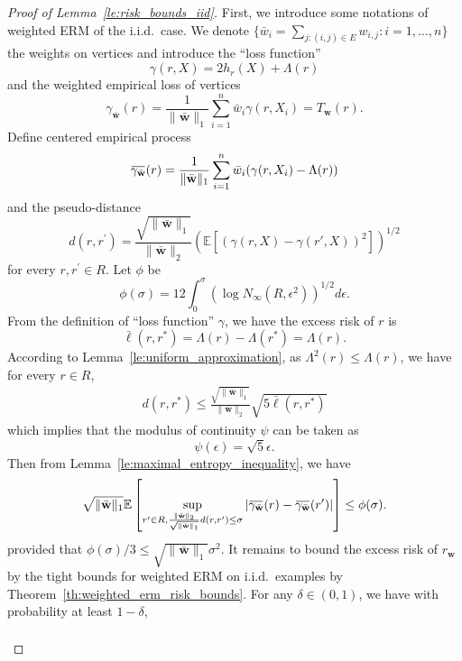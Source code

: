 \documentclass[letterpaper]{article} %
\def\DoubleColumn{}
\newcommand{\E}{\mathbb{E}}
\newcommand{\overbar}[1]{\mkern 1.5mu\overline{\mkern-1.5mu#1\mkern-1.5mu}\mkern 1.5mu}
\newcommand*\cen[1]{\overbar{#1}}
\newcommand{\weight}{\mathbf{w}}
\newcommand{\verticeweight}{\bar{\mathbf{w}}}
\newcommand{\relossf}{\bar{\ell}}
\newcommand{\cenprocess}[1]{\cen{\gamma_{#1}}}
\newcommand{\pair}[1]{(#1)}
\newcommand{\normo}[1]{\|#1\|_1}
\begin{document}
\begin{proof}[Proof of Lemma~\ref{le:risk_bounds_iid}] %
    First, we introduce some notations of weighted ERM of the i.i.d.\ case. 
    We denote $\{\bar{w}_i=\sum_{j:\pair{i,j}\in E}w_{i,j}: i=1,\dots,n\}$ the weights on vertices and introduce the ``loss function''
    \[\gamma(r, X)=2h_r(X)+\Lambda{}(r)\]
    and the weighted empirical loss of vertices
    \[\gamma_\verticeweight{}(r)=\frac{1}{\normo{\verticeweight{}}}\sum_{i=1}^n\bar{w}_i\gamma(r,X_i)=T_\weight{}(r).\]
    Define centered empirical process
    \[\cenprocess{\verticeweight}(r)=\frac{1}{\normo{\verticeweight{}}}\sum_{i=1}^n\bar{w}_i(\gamma(r,X_i)-\Lambda(r))\]
    and the pseudo-distance
    \[d(r,r^\prime) = \frac{\sqrt{\normo{\verticeweight{}}}}{\|\verticeweight\|_2}\left(\E[(\gamma(r,X)-\gamma(r',X))^2]\right)^{1/2}\]
    for every $r,r^\prime\in R$.
    Let $\phi$ be
    \begin{equation}
        \label{eq:proof_phi}
        \phi(\sigma)=12\int_0^{\sigma}(\log N_\infty(R,\epsilon^2))^{1/2}d\epsilon.
    \end{equation}
    From the definition of ``loss function'' $\gamma$, we have the excess risk of $r$ is
    \[\relossf(r,r^*)=\Lambda(r)-\Lambda(r^*)=\Lambda(r).\]
    According to Lemma~\ref{le:uniform_approximation}, as $\Lambda^2(r)\le \Lambda(r)$, we have for every $r\in R$,
    \begin{align*}
        d(r,r^*)\le \frac{\sqrt{\normo{\verticeweight{}}}}{\|\verticeweight\|_2}\sqrt{5\relossf(r,r^*)}
    \end{align*}
    which implies that the modulus of continuity $\psi$ can be taken as
    \begin{equation}
        \label{eq:proof_psi}
        \psi(\epsilon)=\sqrt{5}\epsilon.
    \end{equation}
    Then from Lemma~\ref{le:maximal_entropy_inequality}, we have
    \[\sqrt{\normo{\verticeweight{}}}\E\left[\sup_{r^\prime\in R,\frac{\|\verticeweight\|_2}{\sqrt{\normo{\verticeweight{}}}}d(r,r^\prime)\le \sigma}|\cenprocess{\verticeweight}(r)-\cenprocess{\verticeweight}(r^\prime)|\right]\le \phi(\sigma).\]
    provided that $\phi(\sigma)/3\le \sqrt{\normo{\verticeweight{}}}\sigma^2$.
    It remains to bound the excess risk of $r_\weight{}$ by the tight bounds for weighted ERM on i.i.d.\ examples by Theorem~\ref{th:weighted_erm_risk_bounds}. For any $\delta\in(0,1)$, we have with probability at least $1-\delta$,
    \DoubleColumn
    \begin{equation}
        \begin{aligned}

\end{aligned}
\end{equation}
\end{proof}
\end{document}
